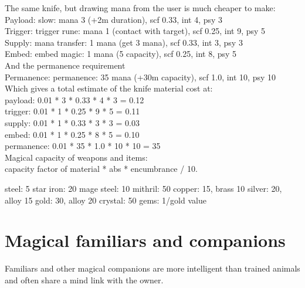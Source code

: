 The same knife, but drawing mana from the user is much cheaper to make: \\
Payload: slow: mana 3 (+2m duration), scf 0.33, int 4, psy 3 \\
Trigger: trigger rune: mana 1 (contact with target), scf 0.25, int 9, psy 5 \\
Supply: mana transfer: 1 mana (get 3 mana), scf 0.33, int 3, psy 3 \\
Embed: embed magic: 1 mana (5 capacity), scf 0.25, int 8, psy 5 \\
And the permanence requirement \\
Permanence: permanence: 35 mana (+30m capacity), scf 1.0, int 10, psy 10 \\
Which gives a total estimate of the knife material cost at: \\
payload: 0.01 * 3 * 0.33 * 4 * 3 = 0.12 \\
trigger: 0.01 * 1 * 0.25 * 9 * 5 = 0.11 \\
supply: 0.01 * 1 * 0.33 * 3 * 3 = 0.03 \\
embed: 0.01 * 1 * 0.25 * 8 * 5 = 0.10 \\
permanence: 0.01 * 35 * 1.0 * 10 * 10 = 35 \\



Magical capacity of weapons and items:\\
capacity factor of material * abs * encumbrance / 10.

steel:       5
star iron:  20
mage steel: 10
mithril:    50
copper:     15, brass 10
silver:     20, alloy 15
gold:       30, alloy 20
crystal:    50
gems:       1/gold value


\section*{Magical familiars and companions}

Familiars and other magical companions are more intelligent than trained animals and often share a mind link with the owner.





